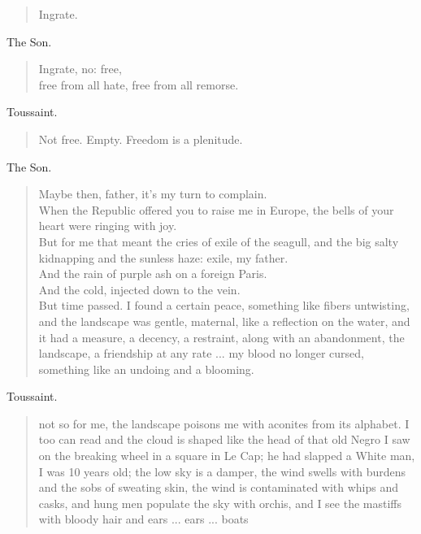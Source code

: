 \documentclass[letterpaper,article,12pt,oneside,notitlepage]{memoir}
\begin{document}
\begin{verse}
Ingrate. \\
\end{verse}

\begin{center}The Son.\end{center}

\begin{verse}
Ingrate, no: free, \\
free from all hate, free from all remorse. \\
\end{verse}

\begin{center}Toussaint.\end{center}

\begin{verse}
Not free. Empty. Freedom is a plenitude. \\
\end{verse}

\begin{center}The Son.\end{center}

\begin{verse}
Maybe then, father, it's my turn to complain. \\
When the Republic offered you to raise me in Europe, the bells of your heart were ringing with joy.  \\
But for me that meant the cries of exile of the seagull, and the big salty kidnapping and the sunless haze: exile, my father.  \\
And the rain of purple ash on a foreign Paris. \\
And the cold, injected down to the vein. \\
But time passed. I found a certain peace, something like fibers untwisting, and the landscape was gentle, maternal, like a reflection on the water, and it had a measure, a decency, a restraint, along with an abandonment, the landscape, a friendship at any rate ... my blood no longer cursed, something like an undoing and a blooming.  \\
\end{verse}

\begin{center}Toussaint.\end{center}

\begin{verse}
not so for me, the landscape poisons me with aconites from its alphabet. I too can read and the cloud is shaped like the head of that old Negro I saw on the breaking wheel in a square in Le Cap; he had slapped a White man, I was 10 years old; the low sky is a damper, the wind swells with burdens and the sobs of sweating skin, the wind is contaminated with whips and casks, and hung men populate the sky with orchis, and I see the mastiffs with bloody hair and ears ... ears ... boats  \\
\end{verse}
\end{document}
